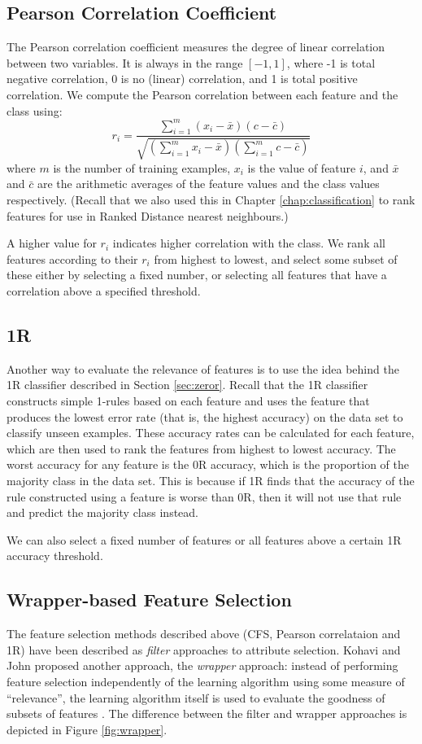 \subsection{Pearson Correlation Coefficient}
The Pearson correlation coefficient measures the degree of linear correlation
between two variables. It is always in the range $[-1,1]$, where -1 is total
negative correlation, 0 is no (linear) correlation, and 1 is total positive
correlation. We compute the Pearson correlation between each feature and the
class using:
\begin{equation*}
r_i = \dfrac{\sum_{i=1}^m (x_i-\bar{x})(c-\bar{c})}{\sqrt{(\sum_{i=1}^m x_i-\bar{x})(\sum_{i=1}^m c-\bar{c})}}
\end{equation*}
where $m$ is the number of training examples, $x_i$ is the value of feature
$i$, and $\bar{x}$ and $\bar{c}$ are the arithmetic averages of the feature
values and the class values respectively. (Recall that we also used this
in Chapter \ref{chap:classification} to rank features for use in Ranked
Distance nearest neighbours.) 

A higher value for $r_i$ indicates higher correlation with the class. We
rank all features according to their $r_i$ from highest to lowest, and select
some subset of these either by selecting a fixed number, or selecting all
features that have a correlation above a specified threshold.

\subsection{1R}
Another way to evaluate the relevance of features is to use the idea behind the
1R classifier described in Section \ref{sec:zeror}. Recall that the 1R
classifier constructs simple 1-rules based on each feature and uses the feature
that produces the lowest error rate (that is, the highest accuracy) on the data
set to classify unseen examples. These accuracy rates can be calculated for
each feature, which are then used to rank the features from highest to lowest
accuracy. The worst accuracy for any feature is the 0R accuracy, which is the
proportion of the majority class in the data set. This is because if 1R finds
that the accuracy of the rule constructed using a feature is worse than 0R,
then it will not use that rule and predict the majority class instead.

We can also select a fixed number of features or all features above a certain
1R accuracy threshold.

\subsection{Wrapper-based Feature Selection}
The feature selection methods described above (CFS, Pearson correlataion and
1R) have been described as \textit{filter} approaches to attribute selection.
Kohavi and John proposed another approach, the \textit{wrapper} approach:
instead of performing feature selection independently of the learning
algorithm using some measure of ``relevance'',
the learning algorithm itself is used to evaluate the goodness of
subsets of features \cite{Kohavi1997}. The difference between the filter
and wrapper approaches is depicted in Figure \ref{fig:wrapper}.

